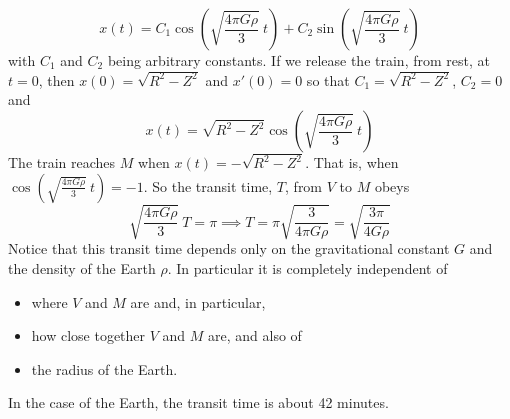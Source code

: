 \begin{eg}
\begin{equation*}
x(t)  = C_1 \cos\left(\sqrt{\frac{4\pi G\rho}{3}}\ t\right) 
             +  C_2 \sin\left(\sqrt{\frac{4\pi G\rho}{3}}\ t\right) 
\end{equation*}
with $C_1$ and $C_2$ being arbitrary constants. If we release the train, 
from rest, at $t=0$, then $x(0) = \sqrt{R^2-Z^2}$ and $x'(0)=0$
so that $C_1= \sqrt{R^2-Z^2}$, $C_2=0$ and
\begin{equation*}
x(t)  = \sqrt{R^2-Z^2} \cos\left(\sqrt{\frac{4\pi G\rho}{3}}\ t\right) 
\end{equation*}
The train reaches $M$ when $x(t)  = -\sqrt{R^2-Z^2}$. That is, when
$\cos\left(\sqrt{\frac{4\pi G\rho}{3}}\ t\right)=-1$. So the transit
time, $T$, from $V$ to $M$ obeys
\begin{equation*}
\sqrt{\frac{4\pi G\rho}{3}}\ T=\pi
\implies
T= \pi  \sqrt{\frac{3}{4\pi G\rho}}
  = \sqrt{\frac{3\pi}{4 G\rho}}
\end{equation*}
Notice that this transit time depends only on the gravitational constant
$G$ and the density of the Earth $\rho$. In particular it is 
completely independent of  
\begin{itemize}\itemsep1pt \parskip0pt  %
\item[$\circ$]
where $V$ and $M$ are and, in particular, 
\item[$\circ$]
how close together $V$ and $M$ are, and also of
\item[$\circ$]
the radius of the Earth.
\end{itemize}
In the case of the Earth, the transit time is about 42 minutes.


\end{eg}



